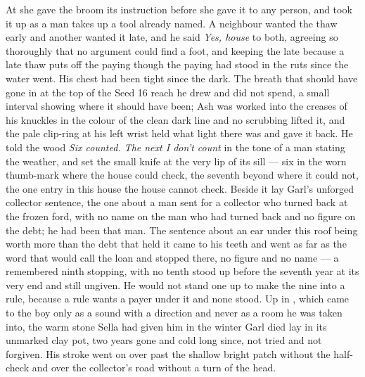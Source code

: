At  she gave the broom its instruction before she gave it to any person, and  took it up as a man takes up a tool already named. A neighbour wanted the thaw early and another wanted it late, and he said \emph{Yes, house} to both, agreeing so thoroughly that no argument could find a foot, and keeping the late because a late thaw puts off the paying though the paying had stood in the ruts since the water went. His chest had been tight since the dark. The breath that should have gone in at the top of the Seed 16 reach he drew and did not spend, a small interval showing where it should have been; Ash was worked into the creases of his knuckles in the colour of the clean dark line and no scrubbing lifted it, and the pale clip-ring at his left wrist held what light there was and gave it back. He told the wood \emph{Six counted. The next I don't count} in the tone of a man stating the weather, and set the small knife at the very lip of its sill --- six in the worn thumb-mark where the house could check, the seventh beyond where it could not, the one entry in this house the house cannot check. Beside it lay Garl's unforged collector sentence, the one about a man sent for a collector who turned back at the frozen ford, with no name on the man who had turned back and no figure on the debt; he had been that man. The sentence about an ear under this roof being worth more than the debt that held it came to his teeth and went as far as the word that would call the loan and stopped there, no figure and no name --- a remembered ninth stopping, with no tenth stood up before the seventh year at its very end and still ungiven. He would not stand one up to make the nine into a rule, because a rule wants a payer under it and none stood. Up in , which came to the boy only as a sound with a direction and never as a room he was taken into, the warm stone Sella had given him in the winter Garl died lay in its unmarked clay pot, two years gone and cold long since, not tried and not forgiven. His stroke went on over  past the shallow bright patch without the half-check and over the collector's road without a turn of the head.

